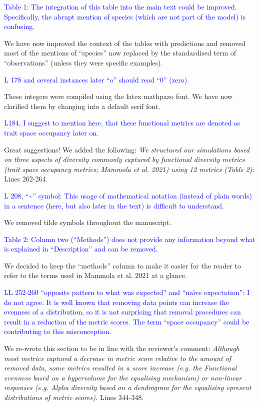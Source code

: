 \documentclass[
]{article}
\begin{document}
\textcolor{blue}{Table 1: The integration of this table into the main text could be improved.
Specifically, the abrupt mention of species (which are not part of the model) is confusing.}

We have now improved the context of the tables with predictions and removed most of the mentions of ``species'' now replaced by the standardised term of ``observations'' (unless they were specific examples).

\textcolor{blue}{L 178 and several instances later ``o'' should read ``0'' (zero).}

These integers were compiled using the latex mathpazo font.
We have now clarified them by changing into a default serif font.

\textcolor{blue}{L184, I suggest to mention here, that these functional metrics are denoted as trait space occupancy later on.}

Great suggestions!
We added the following:
\textit{We structured our simulations based on three aspects of diversity commonly captured by functional diversity metrics (trait space occupancy metrics; Mammola et al. 2021) using 12 metrics (Table 2):}
Lines 262-264.

\textcolor{blue}{L 208, ``\textasciitilde{}'' symbol: This usage of mathematical notation (instead of plain words) in a sentence (here, but also later in the text) is difficult to understand.}

We removed tilde symbols throughout the manuscript.

\textcolor{blue}{Table 2: Column two (``Methods'') does not provide any information beyond what is explained in ``Description'' and can be removed.}

We decided to keep the ``methods'' column to make it easier for the reader to refer to the terms used in Mammola et al. 2021 at a glance.

\textcolor{blue}{LL 252-260 ``opposite pattern to what was expected'' and ``naïve expectation'': I do not agree.
It is well known that removing data points can increase the evenness of a distribution, so it is not surprising that removal procedures can result in a reduction of the metric scores.
The term ``space occupancy'' could be contributing to this misconception.}

We re-wrote this section to be in line with the reviewer's comment:
\textit{Although most metrics captured a decrease in metric score relative to the amount of removed data, some metrics resulted in a score increase (e.g. the Functional evenness based on a hypervolume for the equalising mechanism) or non-linear responses (e.g. Alpha diversity based on a dendrogram for the equalising epresent distributions of metric scores).}
Lines 344-348.
\end{document}
